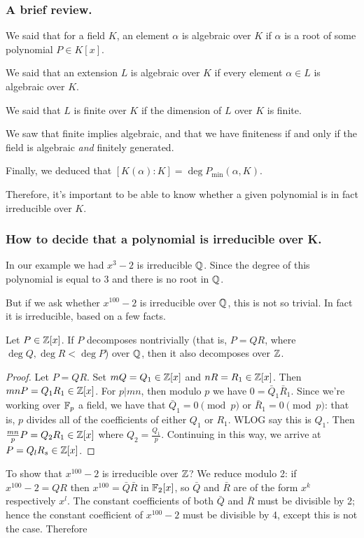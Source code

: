 \subsubsection{A brief review.}
We said that for a field $K$, an element $\alpha$ is algebraic over $K$ if $\alpha$ is a root of some polynomial $P \in K[x]$. 

We said that an extension $L$ is algebraic over $K$ if every element $\alpha \in L$ is algebraic over $K$. 

We said that $L$ is finite over $K$ if the dimension of $L$ over $K$ is finite.

We saw that finite implies algebraic, and that we have finiteness if and only if the field is algebraic \emph{and} finitely generated.

Finally, we deduced that $[K(\alpha):K] = \deg P_{\min}(\alpha, K)$.

Therefore, it's important to be able to know whether a given polynomial is in fact irreducible over $K$.

\subsubsection{How to decide that a polynomial is irreducible over K.}
In our example we had $x^3 - 2$ is irreducible $\mathbb{Q}$. Since the degree of this polynomial is equal to 3 and there is no root in $\mathbb{Q}$.

But if we ask whether $x^{100} - 2$ is irreducible over $\mathbb{Q}$, this is not so trivial. In fact it is irreducible, based on a few facts.

\begin{lem}[Gauss]
Let $P \in \mathbb{Z}[x]$. If $P$ decomposes nontrivially (that is, $P = QR$, where $\deg Q, \deg R < \deg P$) over $\mathbb{Q}$, then it also decomposes over $\mathbb{Z}$.
\end{lem}
\begin{proof}
Let $P = QR$. Set $m Q = Q_1 \in \mathbb{Z}[x]$ and $n R = R_1 \in \mathbb{Z}[x]$. Then $mn P = Q_1 R_1 \in \mathbb{Z}[x]$. For $p | mn$, then modulo $p$ we have $0 = \bar{Q}_1 \bar{R}_1$. Since we're working over $\mathbb{F}_p$ a field, we have that $\bar{Q}_1 = 0 \pmod p$ or $\bar{R}_1 = 0 \pmod p$: that is, $p$ divides all of the coefficients of either $Q_1$ or $R_1$. WLOG say this is $Q_1$. Then $\frac{mn}{p} P = Q_2 R_1 \in \mathbb{Z}[x]$ where $Q_2 = \frac{Q_1}{p}$. Continuing in this way, we arrive at $P = Q_l R_s \in \mathbb{Z}[x]$.
\end{proof}
\begin{ex}
To show that $x^{100} - 2$ is irreducible over $\mathbb{Z}$? We reduce modulo 2: if $x^{100} - 2 = QR$ then $x^{100} = \bar{Q} \bar{R}$ in $\mathbb{F}_2[x]$, so $\bar{Q}$ and $\bar{R}$ are of the form $x^k$ respectively $x^l$. The constant coefficients of both $\bar{Q}$ and $\bar{R}$ must be divisible by 2; hence the constant coefficient of $x^{100} - 2$ must be divisible by 4, except this is not the case. Therefore 
\end{ex}


